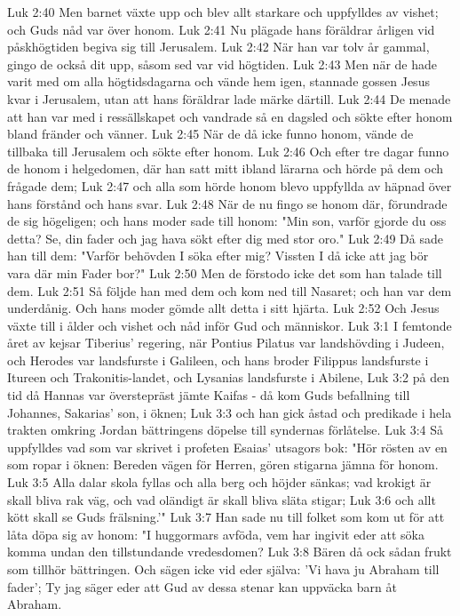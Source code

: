 Luk 2:40  Men barnet växte upp och blev allt starkare och uppfylldes av vishet; och Guds nåd var över honom.
Luk 2:41  Nu plägade hans föräldrar årligen vid påskhögtiden begiva sig till Jerusalem.
Luk 2:42  När han var tolv år gammal, gingo de också dit upp, såsom sed var vid högtiden.
Luk 2:43  Men när de hade varit med om alla högtidsdagarna och vände hem igen, stannade gossen Jesus kvar i Jerusalem, utan att hans föräldrar lade märke därtill.
Luk 2:44  De menade att han var med i ressällskapet och vandrade så en dagsled och sökte efter honom bland fränder och vänner.
Luk 2:45  När de då icke funno honom, vände de tillbaka till Jerusalem och sökte efter honom.
Luk 2:46  Och efter tre dagar funno de honom i helgedomen, där han satt mitt ibland lärarna och hörde på dem och frågade dem;
Luk 2:47  och alla som hörde honom blevo uppfyllda av häpnad över hans förstånd och hans svar.
Luk 2:48  När de nu fingo se honom där, förundrade de sig högeligen; och hans moder sade till honom: "Min son, varför gjorde du oss detta? Se, din fader och jag hava sökt efter dig med stor oro."
Luk 2:49  Då sade han till dem: "Varför behövden I söka efter mig? Vissten I då icke att jag bör vara där min Fader bor?"
Luk 2:50  Men de förstodo icke det som han talade till dem.
Luk 2:51  Så följde han med dem och kom ned till Nasaret; och han var dem underdånig. Och hans moder gömde allt detta i sitt hjärta.
Luk 2:52  Och Jesus växte till i ålder och vishet och nåd inför Gud och människor.
Luk 3:1  I femtonde året av kejsar Tiberius' regering, när Pontius Pilatus var landshövding i Judeen, och Herodes var landsfurste i Galileen, och hans broder Filippus landsfurste i Itureen och Trakonitis-landet, och Lysanias landsfurste i Abilene,
Luk 3:2  på den tid då Hannas var överstepräst jämte Kaifas - då kom Guds befallning till Johannes, Sakarias' son, i öknen;
Luk 3:3  och han gick åstad och predikade i hela trakten omkring Jordan bättringens döpelse till syndernas förlåtelse.
Luk 3:4  Så uppfylldes vad som var skrivet i profeten Esaias' utsagors bok: "Hör rösten av en som ropar i öknen: Bereden vägen för Herren, gören stigarna jämna för honom.
Luk 3:5  Alla dalar skola fyllas och alla berg och höjder sänkas; vad krokigt är skall bliva rak väg, och vad oländigt är skall bliva släta stigar;
Luk 3:6  och allt kött skall se Guds frälsning.'"
Luk 3:7  Han sade nu till folket som kom ut för att låta döpa sig av honom: "I huggormars avföda, vem har ingivit eder att söka komma undan den tillstundande vredesdomen?
Luk 3:8  Bären då ock sådan frukt som tillhör bättringen. Och sägen icke vid eder själva: 'Vi hava ju Abraham till fader'; Ty jag säger eder att Gud av dessa stenar kan uppväcka barn åt Abraham.
